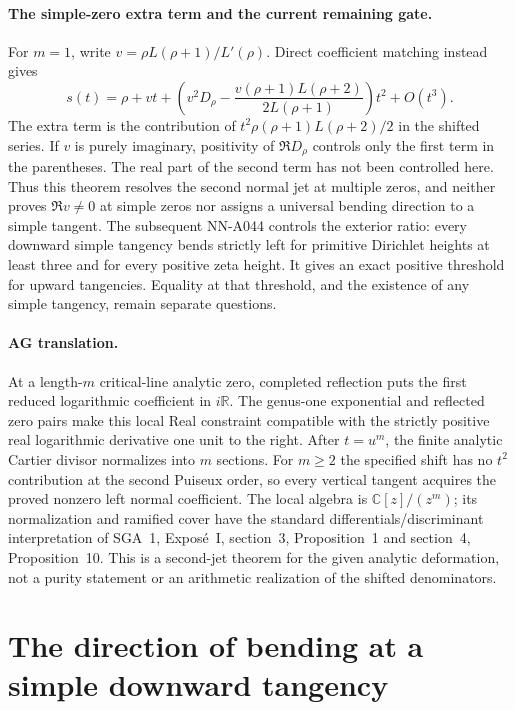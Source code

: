 \paragraph{The simple-zero extra term and the current remaining gate.}
For $m=1$, write $v=\rho L(\rho+1)/L'(\rho)$. Direct
coefficient matching instead gives
\begin{equation}\label{eq:analytic-simple-extra-term}
 s(t)=\rho+vt+
 \left(v^2D_\rho-
       \frac{v(\rho+1)L(\rho+2)}{2L(\rho+1)}\right)t^2
       +O(t^3).
\end{equation}
The extra term is the contribution of
$t^2\rho(\rho+1)L(\rho+2)/2$ in the shifted series.
If $v$ is purely imaginary, positivity of $\Re D_\rho$
controls only the first term in the parentheses. The real
part of the second term has not been controlled here.
Thus this theorem resolves the second normal jet at multiple
zeros, and neither proves $\Re v\ne0$ at simple zeros nor
assigns a universal bending direction to a simple tangent.
The subsequent NN-A044 controls the exterior ratio: every downward
simple tangency bends strictly left for primitive Dirichlet
heights at least three and for every positive zeta height.
It gives an exact positive threshold for upward tangencies.
Equality at that threshold, and the existence of any simple
tangency, remain separate questions.

\paragraph{AG translation.}
At a length-$m$ critical-line analytic zero, completed
reflection puts the first reduced logarithmic coefficient
in $i\mathbb R$. The genus-one exponential and reflected
zero pairs make this local Real constraint compatible with
the strictly positive real logarithmic derivative one unit
to the right. After $t=u^m$, the finite analytic Cartier
divisor normalizes into $m$ sections. For $m\ge2$ the
specified shift has no $t^2$ contribution at the second
Puiseux order, so every vertical tangent acquires the
proved nonzero left normal coefficient. The local algebra
is $\mathbb C[z]/(z^m)$; its normalization and ramified
cover have the standard differentials/discriminant
interpretation of SGA~1, Expos\'e~I, section~3,
Proposition~1 and section~4, Proposition~10. This is a
second-jet theorem for the given analytic deformation,
not a purity statement or an arithmetic realization of
the shifted denominators.


\section{The direction of bending at a simple downward tangency}
\label{sec:A044-simple-tangencies}

